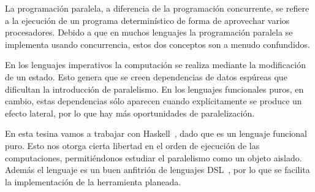 


La programaci\'on paralela, a diferencia de la programaci\'on concurrente, se refiere
a la ejecuci\'on de un programa determin\'istico de forma de
aprovechar varios procesadores. Debido a que en muchos lenguajes la
programaci\'on paralela se implementa usando concurrencia, estos dos
conceptos son a menudo confundidos. 

En los lenguajes imperativos la computaci\'on se realiza mediante la
modificaci\'on de un estado. Esto genera que se creen dependencias de
datos esp\'ureas que dificultan la introducci\'on de paralelismo. En
los lenguajes funcionales puros, en cambio, estas dependencias s\'olo
aparecen cuando expl\'icitamente se produce un efecto lateral, por lo
que hay m\'as oportunidades de paralelizaci\'on.  

En esta tesina vamos a trabajar con Haskell~\parencite{Marlow_haskell2010}, dado que es un
lenguaje funcional puro. Esto nos otorga cierta libertad en el orden de ejecuci\'on
de las computaciones, permiti\'endonos estudiar el paralelismo como un
objeto aislado. Adem\'as el lenguaje es un buen anfitri\'on de
lenguajes DSL~\parencite{Hudak:1996:BDE:242224.242477,Gill:2014:DLC:2611429.2617811}, por lo que se facilita la
implementaci\'on de la herramienta planeada.

